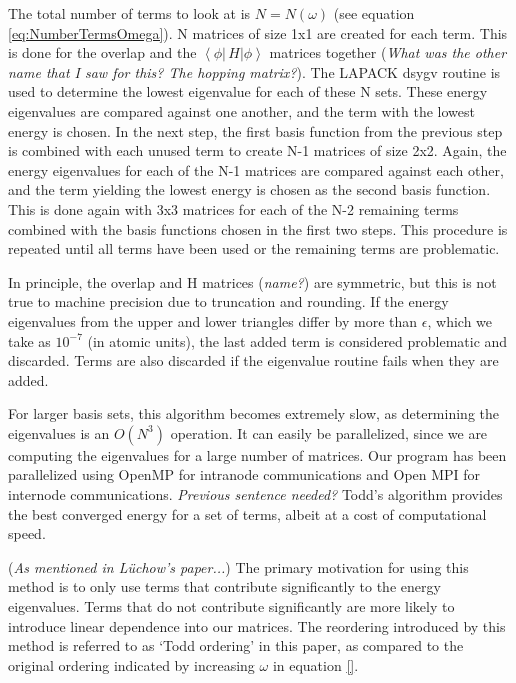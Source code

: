 \documentclass[preprint,showpacs,preprintnumbers,amsmath,amssymb]{revtex4}
\begin{document}
The total number of terms to look at is $N = N(\omega)$ (see equation \ref{eq:NumberTermsOmega}).  N matrices of size 1x1 are created for each term.  This is done for the overlap and the $\left\langle \phi \left| \,H \right| \phi \right\rangle$ matrices together (\emph{What was the other name that I saw for this? The hopping matrix?}).  The LAPACK dsygv routine is used to determine the lowest eigenvalue for each of these N sets.  These energy eigenvalues are compared against one another, and the term with the lowest energy is chosen. In the next step, the first basis function from the previous step is combined with each unused term to create N-1 matrices of size 2x2. Again, the energy eigenvalues for each of the N-1 matrices are compared against each other, and the term yielding the lowest energy is chosen as the second basis function. This is done again with 3x3 matrices for each of the N-2 remaining terms combined with the basis functions chosen in the first two steps. This procedure is repeated until all terms have been used or the remaining terms are problematic. 

In principle, the overlap and H matrices (\emph{name?}) are symmetric, but this is not true to machine precision due to truncation and rounding.  If the energy eigenvalues from the upper and lower triangles differ by more than $\epsilon$, which we take as $10^{-7}$ (in atomic units), the last added term is considered problematic and discarded. Terms are also discarded if the eigenvalue routine fails when they are added.

For larger basis sets, this algorithm becomes extremely slow, as determining the eigenvalues is an $O(N^3)$ operation.  It can easily be parallelized, since we are computing the eigenvalues for a large number of matrices. Our program has been parallelized using OpenMP for intranode communications and Open MPI for internode communications. \emph{Previous sentence needed?} Todd's algorithm provides the best converged energy for a set of terms, albeit at a cost of computational speed.

(\emph{As mentioned in L\"uchow's paper...}) The primary motivation for using this method is to only use terms that contribute significantly to the energy eigenvalues. Terms that do not contribute significantly are more likely to introduce linear dependence into our matrices. The reordering introduced by this method is referred to as `Todd ordering' in this paper, as compared to the original ordering indicated by increasing $\omega$ in equation \ref{}.
\end{document}
